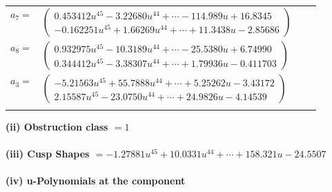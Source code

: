 \documentclass[1p]{elsarticle_modified}
\theoremstyle{definition}
\begin{document}
\begin{tabular}{m{7pt} m{180pt} m{7pt} m{180pt} }
\flushright $a_{7}=$&$\begin{pmatrix}0.453412 u^{45}-3.22680 u^{44}+\cdots-114.989 u+16.8345\\-0.162251 u^{45}+1.66269 u^{44}+\cdots+11.3438 u-2.85686\end{pmatrix}$ \\
\flushright $a_{8}=$&$\begin{pmatrix}0.932975 u^{45}-10.3189 u^{44}+\cdots-25.5380 u+6.74990\\0.344412 u^{45}-3.38307 u^{44}+\cdots+1.79936 u-0.411703\end{pmatrix}$ \\
\flushright $a_{3}=$&$\begin{pmatrix}-5.21563 u^{45}+55.7888 u^{44}+\cdots+5.25262 u-3.43172\\2.15587 u^{45}-23.0750 u^{44}+\cdots+24.9826 u-4.14539\end{pmatrix}$\\&\end{tabular}
\flushleft \textbf{(ii) Obstruction class $= 1$}\\~\\
\flushleft \textbf{(iii) Cusp Shapes $= -1.27881 u^{45}+10.0331 u^{44}+\cdots+158.321 u-24.5507$}\\~\\
\newpage\renewcommand{\arraystretch}{1}
\flushleft \textbf{(iv) u-Polynomials at the component}\newline \\
\end{document}
